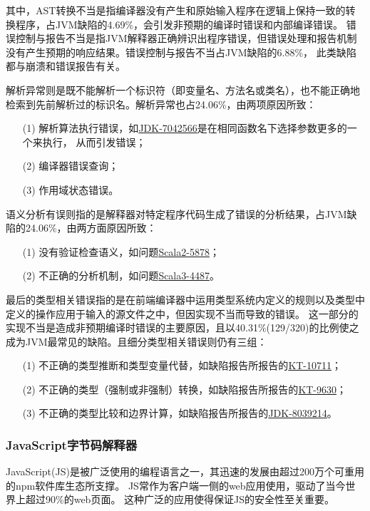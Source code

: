 		其中，AST转换不当是指编译器没有产生和原始输入程序在逻辑上保持一致的转换程序，占JVM缺陷的4.69\%，会引发非预期的编译时错误和内部编译错误。
		错误控制与报告不当是指JVM解释器正确辨识出程序错误，但错误处理和报告机制没有产生预期的响应结果。错误控制与报告不当占JVM缺陷的6.88\%，
		此类缺陷都与崩溃和错误报告有关。
		
		解析异常则是既不能解析一个标识符（即变量名、方法名或类名），也不能正确地检索到先前解析过的标识名。解析异常也占24.06\%，由两项原因所致：
		\begin{itemize}
			\item [(1)] 解析算法执行错误，如\href{https://bugs.openjdk.java.net/browse/JDK-7042566}{JDK-7042566}是在相同函数名下选择参数更多的一个来执行，
						从而引发错误；
			\item [(2)] 编译器错误查询；
			\item [(3)] 作用域状态错误。
		\end{itemize}
		
		语义分析有误则指的是解释器对特定程序代码生成了错误的分析结果，占JVM缺陷的24.06\%，由两方面原因所致：
		\begin{itemize}
			\item [(1)] 没有验证检查语义，如问题\href{https://github.com/scala/bug/issues/5878}{Scala2-5878}；
			\item [(2)] 不正确的分析机制，如问题\href{https://github.com/scala/scala3/pull/4487}{Scala3-4487}。 
		\end{itemize}

		最后的类型相关错误指的是在前端编译器中运用类型系统内定义的规则以及类型中定义的操作应用于输入的源文件之中，但因实现不当而导致的错误。
		这一部分的实现不当是造成非预期编译时错误的主要原因，且以40.31\%(129/320)的比例使之成为JVM最常见的缺陷。且细分类型相关错误则仍有三组：
		\begin{itemize}
			\item [(1)] 不正确的类型推断和类型变量代替，如缺陷报告所报告的\href{https://youtrack.jetbrains.com/issue/KT-10711}{KT-10711}；
			\item [(2)] 不正确的类型（强制或非强制）转换，如缺陷报告所报告的\href{https://youtrack.jetbrains.com/issue/KT-9630}{KT-9630}；
			\item [(3)] 不正确的类型比较和边界计算，如缺陷报告所报告的\href{https://bugs.openjdk.org/browse/JDK-8284879}{JDK-8039214}。
		\end{itemize}

		\subsubsection{JavaScript字节码解释器}
		JavaScript(JS)是被广泛使用的编程语言之一，其迅速的发展由超过200万个可重用的npm软件库生态所支撑\cite{bhuiyanSecBenchjsExecutableSecurity2023}。
		JS常作为客户端一侧的web应用使用，驱动了当今世界上超过90\%的web页面\cite{Staicu2018SYNODEUA}。
		这种广泛的应用使得保证JS的安全性至关重要\cite{eomFuzzingJavaScriptInterpreters2024}。

